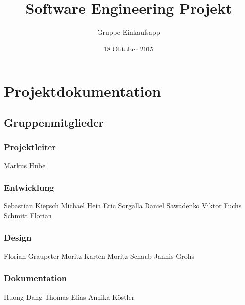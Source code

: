 \documentclass[12pt,a4paper]{article}
\begin{document}
\title{Software Engineering Projekt}
\author{Gruppe Einkaufsapp}
\date {18.Oktober 2015}
\maketitle
\newpage
\tableofcontents
\newpage
\section*{Projektdokumentation}
\subsection*{Gruppenmitglieder}
\subsubsection*{Projektleiter}
Markus Hube
\subsubsection*{Entwicklung}
Sebastian Kiepsch
\newline
Michael Hein
\newline
Eric Sorgalla
\newline
Daniel Sawadenko 
\newline
Viktor Fuchs
\newline
Schmitt Florian
\subsubsection*{Design}
Florian Graupeter
\newline
Moritz Karten
\newline
Moritz Schaub
\newline
Jannis Grohs
\subsubsection*{Dokumentation}
Huong Dang
\newline
Thomas Elias
\newline
Annika Köstler
\newpage
\end{document}
